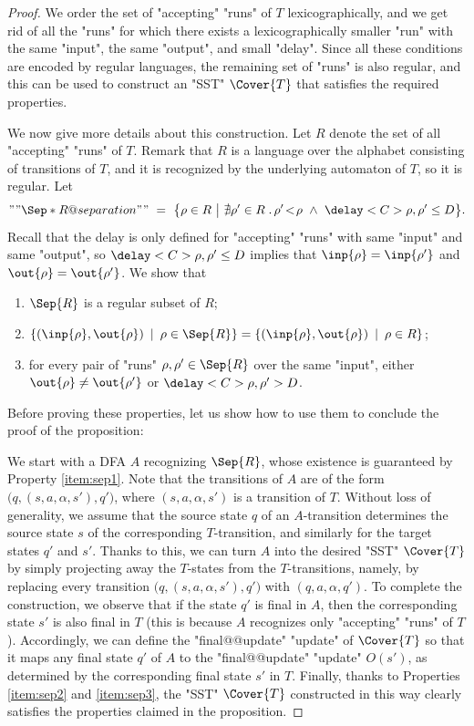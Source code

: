 \documentclass{theoretics}
\newcommand{\finalupd}{O}
\begin{document}
\begin{proof}
We order the set of "accepting" "runs" of $T$ lexicographically,
and we get rid of all the "runs" for which there exists a 
lexicographically smaller "run" with the same "input", 
the same "output", and small "delay". 
Since all these conditions are encoded by regular languages, 
the remaining set of "runs" is also regular, and this can be 
used to construct an "SST" $\Cover{T}$ that satisfies the 
required properties.

We now give more details about this construction. 
Let $R$ denote the set of all "accepting" "runs" of $T$.
Remark that $R$ is a language over the alphabet consisting 
of transitions of $T$, and it is recognized by the underlying 
automaton of $T$, so it is regular.
\AP
Let
\[
    ""\Sep*{R} @separation""
    ~=~
        \big\{  \rho \in R
                ~\big|~
			    \nexists \rho' \in R \; .\,
			    \rho' \!<\! \rho ~\wedge~ \delay<C>{\rho,\rho'} \leq D
        \big\}.
\]
Recall that the delay is only defined for "accepting" "runs" 
with same "input" and same "output", 
so $\delay<C>{\rho,\rho'} \leq D$ implies that $\inp{\rho} = \inp{\rho'}$ 
and $\out{\rho} = \out{\rho'}$.
We show that
\begin{enumerate}[label={\sc\alph*)}]
    \item \label{item:sep1}
          $\Sep{R}$ is a regular subset of $R$;
    \item \label{item:sep2}
          $\{(\inp{\rho}, \out{\rho}) \:\mid\: \rho \in \Sep{R}\} = \{(\inp{\rho}, \out{\rho}) \:\mid\: \rho \in R\}$;
    \item \label{item:sep3}
          for every pair of "runs" $\rho, \rho' \in \Sep{R}$ over the same "input",
          either $\out{\rho} \neq \out{\rho'}$ or $\delay<C>{\rho,\rho'} > D$.
\end{enumerate}
Before proving these properties, let us show how to use them to conclude the 
proof of the proposition:

We start with a DFA $A$ recognizing $\Sep{R}$, whose existence is guaranteed by 
Property \ref{item:sep1}. Note that the transitions of $A$ are of the form
$\big(q,(s,a,\alpha,s'),q'\big)$, where $(s,a,\alpha,s')$ is a transition of $T$.
Without loss of generality, we assume that the source state $q$ 
of an $A$-transition determines the source state $s$ 
of the corresponding $T$-transition, and similarly
for the target states $q'$ and $s'$.
Thanks to this, we can turn $A$ into the desired "SST" $\Cover{T}$
by simply projecting away 
the $T$-states from the $T$-transitions, namely, by replacing every transition
$\big(q,(s,a,\alpha,s'),q'\big)$ with $(q,a,\alpha,q')$. 
To complete the construction, we observe that if the state $q'$
is final in $A$, then the corresponding state $s'$ is also final in $T$
(this is because $A$ recognizes only "accepting" "runs" of $T$). 
Accordingly, we can define the "final@@update" "update" of $\Cover{T}$
so that it maps any final state $q'$ of $A$ to the 
"final@@update" "update" $\finalupd(s')$, as determined by the corresponding
final state $s'$ in $T$.
Finally, thanks to Properties \ref{item:sep2} and \ref{item:sep3}, 
the "SST" $\Cover{T}$ constructed in this way clearly satisfies the 
properties claimed in the proposition.


\end{proof}
\end{document}
